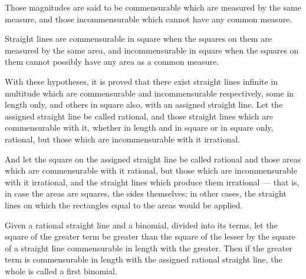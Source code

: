 \documentclass{rrxiv}
\begin{document}

\begin{scope}
\label{def:X.1}
Those magnitudes are said to be commensurable which are measured by
the same measure, and those incommensurable which cannot have any
common measure.
\end{scope}

\begin{scope}
\label{def:X.2}
Straight lines are commensurable in square when the squares on them
are measured by the same area, and incommensurable in square when the
squares on them cannot possibly have any area as a common measure.
\end{scope}

\begin{scope}
\label{def:X.3}
With these hypotheses, it is proved that there exist straight lines
infinite in multitude which are commensurable and incommensurable
respectively, some in length only, and others in square also, with
an assigned straight line.  Let the assigned straight line be called
rational, and those straight lines which are commensurable with it,
whether in length and in square or in square only, rational, but
those which are incommensurable with it irrational.
\end{scope}

\begin{scope}
\label{def:X.4}
And let the square on the assigned straight line be called rational
and those areas which are commensurable with it rational, but those
which are incommensurable with it irrational, and the straight lines
which produce them irrational --- that is, in case the areas are
squares, the sides themselves; in other cases, the straight lines on
which the rectangles equal to the areas would be applied.
\end{scope}


\begin{scope}
\label{def:X.II.1}
Given a rational straight line and a binomial, divided into its terms,
let the square of the greater term be greater than the square of the
lesser by the square of a straight line commensurable in length with
the greater. Then if the greater term is commensurable in length with
the assigned rational straight line, the whole is called a first binomial.
\end{scope}
\end{document}
